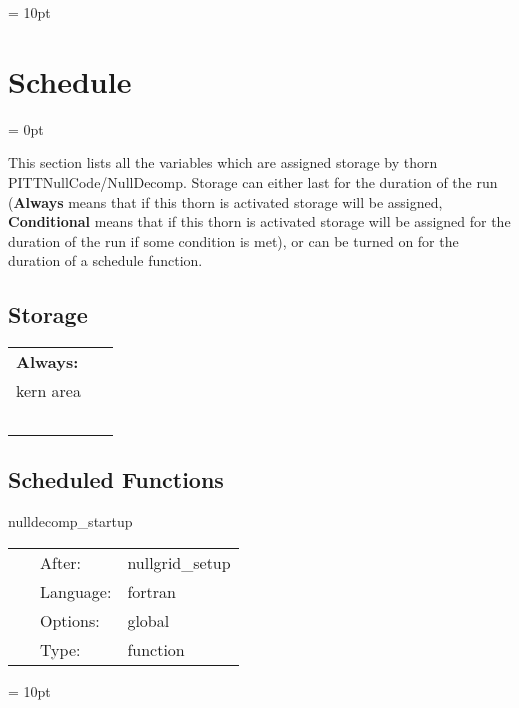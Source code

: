 \vspace{5mm}\parskip = 10pt 

\section{Schedule} 


\parskip = 0pt


\noindent This section lists all the variables which are assigned storage by thorn PITTNullCode/NullDecomp.  Storage can either last for the duration of the run ({\bf Always} means that if this thorn is activated storage will be assigned, {\bf Conditional} means that if this thorn is activated storage will be assigned for the duration of the run if some condition is met), or can be turned on for the duration of a schedule function.


\subsection*{Storage}

\hspace{5mm}

 \begin{tabular*}{160mm}{ll} 

{\bf Always:}&  ~ \\ 
 kern area & ~\\ 
~ & ~\\ 
\end{tabular*} 


\subsection*{Scheduled Functions}
\vspace{5mm}


\hspace{5mm} nulldecomp\_startup 

\hspace{5mm}{\it initialization } 


\hspace{5mm}

 \begin{tabular*}{160mm}{cll} 
~ & After:  & nullgrid\_setup \\ 
~ & Language:  & fortran \\ 
~ & Options:  & global \\ 
~ & Type:  & function \\ 
\end{tabular*} 



\vspace{5mm}\parskip = 10pt 

